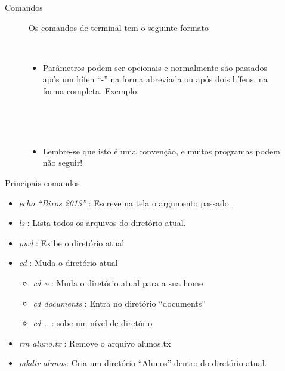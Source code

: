 \documentclass{beamer}
\begin{document}
\begin{frame}{Comandos}
    \begin{figure}[h]
        \centering
        Os comandos de terminal tem o seguinte formato \newline \\
        \begin{shell}
        \end{shell}
        \\
        \begin{itemize}
        \item Parâmetros podem ser opcionais e normalmente são passados após um hífen
          ``-'' na forma abreviada ou após dois hífens, na forma completa.
          Exemplo:
        \end{itemize}
        \begin{shell}
          \\
         \end{shell}
        \\
        \begin{itemize}
        \item{Lembre-se que isto é uma convenção, e muitos programas podem não
          seguir!}
        \end{itemize}
    \end{figure}
\end{frame}

\begin{frame}{Principais comandos}
   \begin{itemize}
   \item \emph{echo ``Bixos 2013''} : Escreve na tela o argumento passado.
   \item \emph{ls} : Lista todos os arquivos do diretório atual.
   \item \emph{pwd} : Exibe o diretório atual
   \item \emph{cd} : Muda o diretório atual
     \begin{itemize}
     \item \emph{cd \~{}} : Muda o diretório atual para a sua home
     \item \emph{cd documents} : Entra no diretório ``documents''
     \item \emph{cd ..} : sobe um nível de diretório
     \end{itemize}
   \item \emph{rm aluno.tx} : Remove o arquivo alunos.tx
   \item \emph{mkdir alunos}: Cria um diretório ``Alunos'' dentro do
     diretório atual.
   \end{itemize}
\end{frame}
\end{document}
